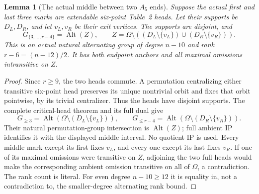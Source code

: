 \documentclass[11pt,a4paper]{article}
\newtheorem{lemma}[proposition]{Lemma}
\newcommand{\Alt}{\operatorname{Alt}}
\begin{document}
\begin{lemma}[The actual middle between two $A_5$ ends]
Suppose the actual first and last three marks are extendable
six-point Table~2 heads. Let their supports be $D_L,D_R$, and let
$v_L,v_R$ be their exit vertices. The supports are disjoint, and
\[
 G_{\{3,\ldots,r-4\}}=\Alt(Z),\qquad
 Z=\Omega\setminus((D_L\setminus\{v_L\})
                   \cup(D_R\setminus\{v_R\})).
\]
This is an actual natural alternating group of degree $n-10$
and rank $r-6=(n-12)/2$. It has both endpoint anchors and all
maximal omissions intransitive on $Z$.
\end{lemma}
\begin{proof}
Since $r\ge9$, the two heads commute. A permutation centralizing
either transitive six-point head preserves its unique nontrivial
orbit and fixes that orbit pointwise, by its trivial centralizer.
Thus the heads have disjoint supports.
The complete critical-head theorem and its full dual give
\[
 G_{\ge3}=\Alt(\Omega\setminus(D_L\setminus\{v_L\})),\qquad
 G_{\le r-4}=\Alt(\Omega\setminus(D_R\setminus\{v_R\})).
\]
Their natural permutation-group intersection is $\Alt(Z)$;
full ambient IP identifies it with the displayed middle interval.
No quotient IP is used. Every middle mark except its first fixes
$v_L$, and every one except its last fixes $v_R$.
If one of its maximal omissions were transitive on $Z$, adjoining
the two full heads would make the corresponding ambient omission
transitive on all of $\Omega$, a contradiction. The rank count
is literal. For even degree $n-10\ge12$ it is equality in, not
a contradiction to, the smaller-degree alternating rank bound.
\end{proof}
\end{document}
